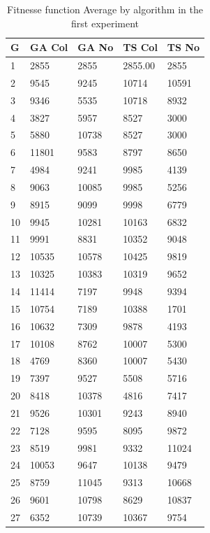 \begin{table}[h]
\centering
\caption{Fitnesse function Average  by algorithm in the first experiment }
\label{tab:averagefirst}
\begin{tabular}{|l|l|l|l|l|}
\hline
G & GA Col  & GA No & TS Col  & TS No\\ \hline
1 & 2855 & 2855 & 2855.00 & 2855\\ \hline
2 & 9545 & 9245 & 10714 & 10591\\ \hline
3 & 9346 & 5535 & 10718 & 8932\\ \hline
4 & 3827 & 5957 & 8527 & 3000\\ \hline
5 & 5880 & 10738 & 8527 & 3000\\ \hline
6 & 11801 & 9583 & 8797 & 8650\\ \hline
7 & 4984 & 9241 & 9985 & 4139\\ \hline
8 & 9063 & 10085 & 9985 & 5256\\ \hline
9 & 8915 & 9099 & 9998 & 6779\\ \hline
10 & 9945 & 10281 & 10163 & 6832\\ \hline
11 & 9991 & 8831 & 10352 & 9048\\ \hline
12 & 10535 & 10578 & 10425 & 9819\\ \hline
13 & 10325 & 10383 & 10319 & 9652\\ \hline
14 & 11414 & 7197 & 9948 & 9394\\ \hline
15 & 10754 & 7189 & 10388 & 1701\\ \hline
16 & 10632 & 7309 & 9878 & 4193\\ \hline
17 & 10108 & 8762 & 10007 & 5300\\ \hline
18 & 4769 & 8360 & 10007 & 5430\\ \hline
19 & 7397 & 9527 & 5508 & 5716\\ \hline
20 & 8418 & 10378 & 4816 & 7417\\ \hline
21 & 9526 & 10301 & 9243 & 8940\\ \hline
22 & 7128 & 9595 & 8095 & 9872\\ \hline
23 & 8519 & 9981 & 9332 & 11024\\ \hline
24 & 10053 & 9647 & 10138 & 9479\\ \hline
25 & 8759 & 11045 & 9313 & 10668\\ \hline
26 & 9601 & 10798 & 8629 & 10837\\ \hline
27 & 6352 & 10739 & 10367 & 9754\\ \hline
\end{tabular}
\end{table}

